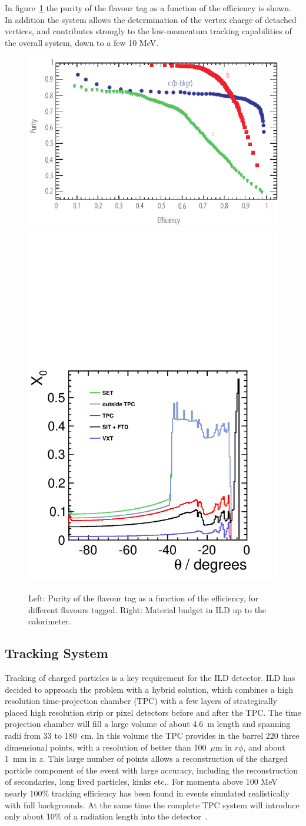 \documentclass[%
 amsmath,amssymb,
 aps,
]{revtex4-1}
\begin{document}
In figure~\ref{fig-btag} the purity of the flavour tag as a function of the efficiency is shown. In addition the system allows the determination of the vertex charge of detached vertices, and contributes strongly to the low-momentum tracking capabilities of the overall system, down to a few 10 MeV. 
\begin{figure}
    \centering
    \includegraphics[width=0.45\hsize]{figures/FlavourTagPurities_Zpeak_DCR-eps-converted-to.pdf}
    \includegraphics[width=0.35\hsize]{figures/material-budget-new.pdf}
    \caption{Left: Purity of the flavour tag as a function of the efficiency, for different flavours tagged. Right: Material budget in ILD up to the calorimeter.}
    \label{fig-btag}
\end{figure}  

\subsection{Tracking System}

Tracking of charged particles is a key requirement for the ILD detector. ILD has decided to approach the problem with a hybrid solution, which combines a high resolution time-projection chamber (TPC) with a few layers of strategically placed high resolution strip or pixel detectors before and after the TPC. 
The time projection chamber will fill a large volume of about 4.6~m length and spanning radii from 33 to 180~cm. In this volume the TPC provides in the barrel 220 three dimensional points, with a resolution of better than 100~$\mu$m in $r \phi$, and about 1~mm in $z$. This large number of points allows a reconstruction of the charged particle component of the event with large accuracy, including the reconstruction of secondaries, long lived particles, kinks etc.. For momenta above 100 MeV nearly 100\% tracking efficiency has been found in events simulated realistically with full backgrounds. At the same time the complete TPC system will introduce only about 10\% of a radiation length into the detector~\cite{Diener:2012mc}. 
\end{document}
